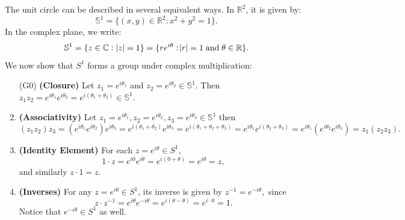 \documentclass[11pt,openany]{article}
\renewcommand{\Re}{\operatorname*{Re}}
\renewcommand{\Im}{\operatorname*{Im}}
\begin{document}
\begin{center}
\end{center}
The unit circle can be described in several equivalent ways. In \(\mathbb{R}^2\), it is given by:
\[
\mathbb{S}^1 = \{ (x,y) \in \mathbb{R}^2 : x^2 + y^2 = 1 \}.
\]
In the complex plane, we write:
\[
\mathbb{S}^1 = \{ z \in \mathbb{C} : |z| = 1 \} = \{ re^{i\theta} : \abs{r}=1\;\text{and}\;\theta \in \mathbb{R} \}.
\]
We now show that \(S^1\) forms a group under complex multiplication: \begin{enumerate}[(G1)]
	\item[(G0)] \textbf{(Closure)}\; Let $z_1 = e^{i\theta_1}$ and $z_2 = e^{i\theta_2} \in \mathbb{S}^1.$
	Then $z_1z_2 = e^{i\theta_1}e^{i\theta_2} = e^{i(\theta_1+\theta_2)}\in\mathbb{S}^1.$
	\item \textbf{(Associativity)}\; Let \(z_1=e^{i\theta_1}, z_2=e^{i\theta_2}, z_3=e^{i\theta_3} \in \mathbb{S}^1\) then \[
	(z_1z_2)z_3 = (e^{i\theta_1}e^{i\theta_2})e^{i\theta_3} = e^{i(\theta_1+\theta_2)}e^{i\theta_3} = e^{i(\theta_1+\theta_2+\theta_3)}=e^{i\theta_1}e^{i(\theta_2+\theta_3)}=e^{i\theta_1}(e^{i\theta_2}e^{i\theta_3})= z_1(z_2z_3).
	\]
	\item \textbf{(Identity Element)}\; For each \(z = e^{i\theta} \in S^1\),
	\[
	1 \cdot z = e^{i0}e^{i\theta} = e^{i(0+\theta)}=e^{i\theta} = z,
	\]
	and similarly \(z \cdot 1 = z\).
	\item \textbf{(Inverses)}\; For any \(z = e^{i\theta} \in S^1\), its inverse is given by $
	z^{-1} = e^{-i\theta},$ since
	\[
	z \cdot z^{-1} = e^{i\theta}e^{-i\theta} = e^{i(\theta-\theta)} = e^{i\cdot 0} = 1.
	\]
	Notice that \(e^{-i\theta} \in S^1\) as well.
\end{enumerate}
\end{document}
